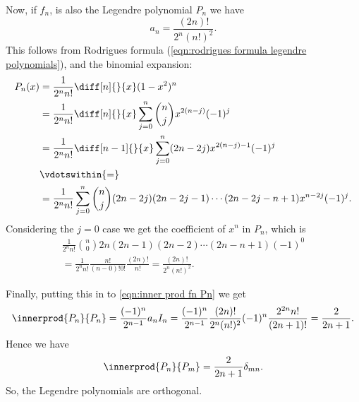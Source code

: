 \documentclass[fleqn]{NotesClass}
\begin{document}
    Now, if \(f_n\), is also the Legendre polynomial \(P_n\) we have
    \begin{equation}
        a_n = \frac{(2n)!}{2^n(n!)^2}.
    \end{equation}
    This follows from Rodrigues formula (\cref{eqn:rodrigues formula legendre polynomials}), and the binomial expansion:
    \begin{align}
        P_n(x) &= \frac{1}{2^nn!} \diff[n]{}{x} (1 - x^2)^n\\
        &= \frac{1}{2^nn!} \diff[n]{}{x} \sum_{j=0}^{n} \binom{n}{j}x^{2(n - j)}(-1)^{j}\\
        &= \frac{1}{2^nn!} \diff[n-1]{}{x} \sum_{j=0}^{n} (2n - 2j)x^{2(n-j)-1}(-1)^{j}\\
        &\vdotswithin{=}\\
        &= \frac{1}{2^nn!} \sum_{j=0}^{n} \binom{n}{j} (2n - 2j)(2n - 2j - 1) \dotsm (2n - 2j - n + 1) x^{n - 2j}(-1)^j.
    \end{align}
    Considering the \(j = 0\) case we get the coefficient of \(x^n\) in \(P_n\), which is
    \begin{multline}
        \frac{1}{2^nn!} \binom{n}{0}2n(2n-1)(2n-2) \dotsm (2n-n+1)(-1)^0 \\
        = \frac{1}{2^nn!} \frac{n!}{(n-0)!0!} \frac{(2n)!}{n!}
        = \frac{(2n)!}{2^n(n!)^2}.
    \end{multline}
    
    Finally, putting this in to \cref{eqn:inner prod fn Pn} we get
    \begin{equation}
        \innerprod{P_n}{P_n} = \frac{(-1)^n}{2^{n-1}}a_nI_n = \frac{(-1)^n}{2^{n-1}} \frac{(2n)!}{2^n(n!)^2} (-1)^n \frac{2^{2n}n!}{(2n+1)!} = \frac{2}{2n+1}.
    \end{equation}
    Hence we have
    \begin{equation}
        \innerprod{P_n}{P_m} = \frac{2}{2n+1} \delta_{mn}.
    \end{equation}
    So, the Legendre polynomials are orthogonal.
    
\end{document}
